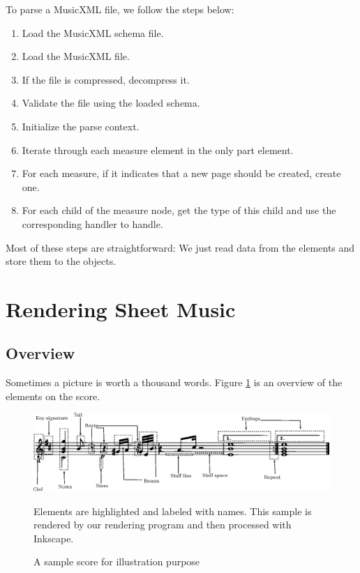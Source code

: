 To parse a MusicXML file, we follow the steps below:
\begin{enumerate}
    \item Load the MusicXML schema file.
    \item Load the MusicXML file.
    \item If the file is compressed, decompress it.
    \item Validate the file using the loaded schema.
    \item Initialize the parse context.
    \item Iterate through each measure element in the only part element.
    \item For each measure, if it indicates that a new page should be created, create one.
    \item For each child of the measure node, get the type of this child and use the corresponding handler to handle.
\end{enumerate}

Most of these steps are straightforward: We just read data from the elements and store them to the objects.


\section{Rendering Sheet Music}
\label{section:rendering-sheet-music}

\subsection{Overview}
Sometimes a picture is worth a thousand words. Figure \ref{fig:score-overview} is an overview of the elements on the score. 
\begin{figure}[h]
    \centering
    \includegraphics[scale=0.7]{Figures/score-overview.eps}
    \caption{A sample score for illustration purpose}
    \label{fig:score-overview}
    \startdescription
    Elements are highlighted and labeled with names. This sample is rendered by our rendering program and then processed with Inkscape.
\end{figure}

